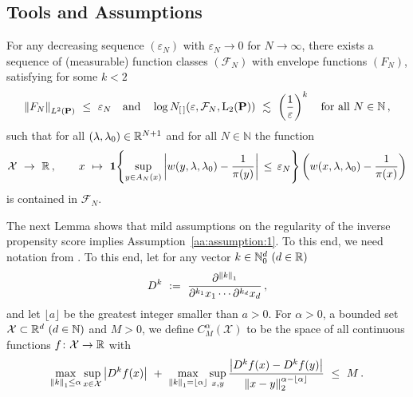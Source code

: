 \subsection{Tools and Assumptions}
\begin{assumption}
  \label{aa:assumption:1}
  For any decreasing sequence
  $(\varepsilon_N)$ with $\varepsilon_N\to 0$ for $N\to\infty$,
there exists a sequence of (measurable) function classes
$(\mathcal{F}_N)$
with envelope functions
$(F_N)$,
satisfying 
for some $k<2$
\begin{gather*}
\norm{F_N}_{L^2(\P)}
\ 
\le
\ 
\varepsilon_N
\quad
\text{and}
\quad
  \log
  N_{[\,]}(\varepsilon,\mathcal{F}_N,\mathrm{L}_2(\P))
  \ 
  \lesssim
  \ 
  \left( 
  \frac{1}{\varepsilon}
  \right)^k
  \quad
  \text{for all}
  \ 
  N\in\mathbb{N}
  \,,
\end{gather*}
such that for all $(\lambda,\lambda_0)\in\mathbb{R}^{N+1}$ and for all $N\in\mathbb{N}$ the function
\begin{gather}
  \label{ghost_function}
  \mathcal{X}
  \ 
  \to
  \ 
  \R
  \,,
  \qquad
  x
  \ 
  \mapsto
  \ 
  \mathbf{1}{
    \left\{ 
      \sup_{y\in A_N(x)}
      \left| 
      w(y,\lambda,\lambda_0)
      -
      \frac{1}{\pi(y)}
      \right|
      \,
      \le
      \,
      \varepsilon_N
    \right\}
  }
  \left( 
      w(x,\lambda,\lambda_0)
      -
      \frac{1}{\pi(x)}
  \right)
\end{gather}
is contained in $\mathcal{F}_N$.
\end{assumption}
The next Lemma shows that mild assumptions on the regularity of the inverse propensity score implies Assumption~\ref{aa:assumption:1}.
To this end, we need notation from \cite[§2.7.1]{vaart2013}.
To this end, let for any vector $k\in\mathbb{N}_0^d \ (d\in\mathbb{R})$
\begin{gather*}
  D^k
  \ :=\ 
  \frac
  {\partial^{\norm{k}_1}}
  {
    \partial^{k_1}x_1
    \cdots
    \partial^{k_d}x_d
  }
  \,,
\end{gather*}
and let $\lfloor a \rfloor$ be the greatest integer smaller than $a>0$.
For $\alpha>0$, a bounded set 
$\mathcal{X}\subset\R^d\ (d\in\mathbb{N})$
and
$M>0$, we define $C^\alpha_M(\mathcal{X})$ to be the space of all continuous functions $f\colon \mathcal{X}\to\mathbb{R}$ with
\begin{gather*}
  \max_{\norm{k}_1\le \alpha}\sup_{x\in\mathcal{X}}
  \left| D^k f(x) \right|
  \ 
  +
  \ 
  \max_{\norm{k}_1=\lfloor \alpha \rfloor}\sup_{x,y}
  \frac
  {
  \left|
  D^k f(x) 
  -
  D^k f(y) 
  \right|
  }
  {
    \norm{x-y}_2^{\alpha-\lfloor \alpha \rfloor}
  }
  \
  \le
  \ 
  M
  \,.
\end{gather*}
